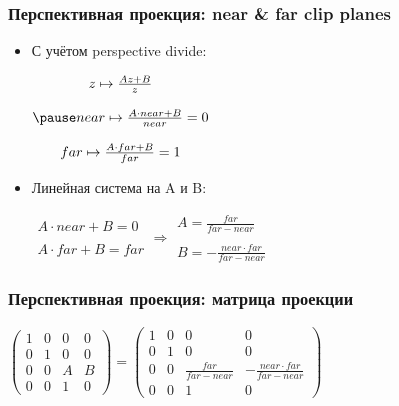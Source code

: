 \documentclass[10pt]{beamer}
\begin{document}
\begin{frame}[fragile]
\frametitle{Перспективная проекция: near \& far clip planes}
\begin{itemize}
\item С учётом perspective divide:
\begin{center}
\begin{math}
\begin{matrix}
z \mapsto \frac{Az + B}{z} \\ \\
\pause
near \mapsto \frac{A\cdot near + B}{near} = 0 \\ \\
far \mapsto \frac{A\cdot far + B}{far} = 1
\end{matrix}
\end{math}
\end{center}
\pause
\item Линейная система на A и B:
\begin{center}
\begin{math}
\begin{matrix}
A \cdot near + B = 0 \\ \\
A \cdot far + B = far
\end{matrix}
\Longrightarrow
\begin{matrix}
A = \frac{far}{far - near} \\ \\
B = - \frac{near \cdot far}{far - near}
\end{matrix}
\end{math}
\end{center}
\end{itemize}
\end{frame}

\begin{frame}[fragile]
\frametitle{Перспективная проекция: матрица проекции}
\begin{center}
\begin{math}
\begin{pmatrix}
1 & 0 & 0 & 0 \\
0 & 1 & 0 & 0 \\
0 & 0 & A & B \\
0 & 0 & 1 & 0
\end{pmatrix}
=
\begin{pmatrix}
1 & 0 & 0 & 0 \\
0 & 1 & 0 & 0 \\
0 & 0 & \frac{far}{far - near} & -\frac{near \cdot far}{far - near} \\
0 & 0 & 1 & 0
\end{pmatrix}
\end{math}
\end{center}
\end{frame}
\end{document}
